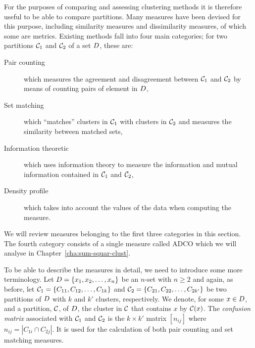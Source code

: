 For the purposes of comparing and assessing clustering methods it is therefore
useful to be able to compare partitions.  Many measures have been devised for
this purpose, including similarity measures and dissimilarity measures, of
which some are metrics.  Existing methods fall into four main categories; for
two partitions $\mathcal{C}_1$ and $\mathcal{C}_2$ of a set $D$, these are:
\begin{description}
\item[Pair counting] which measures the agreement and disagreement between
  $\mathcal{C}_1$ and $\mathcal{C}_2$ by means of counting pairs of element in $D$,
\item[Set matching] which ``matches'' clusters in $\mathcal{C}_1$ with clusters in
  $\mathcal{C}_2$ and measures the similarity between matched sets,
\item[Information theoretic] which uses information theory to measure the
  information and mutual information contained in $\mathcal{C}_1$ and $\mathcal{C}_2$,
\item[Density profile] which takes into account the values of the data when
  computing the measure.
\end{description}

We will review measures belonging to the first three categories in this
section.  The fourth category consists of a single measure called ADCO which
we will analyse in Chapter~\ref{cha:sum-squar-clust}.

To be able to describe the measures in detail, we need to introduce some more
terminology.  Let $D = \{x_1,x_2,\dotsc,x_n\}$ be an $n$-set with $n \geq
2$ and again, as before, let $\mathcal{C}_1 = \{C_{11},C_{12},\dotsc,C_{1k}\}$ and
$\mathcal{C}_2 = \{C_{21},C_{22},\dotsc,C_{2k'}\}$ be two partitions of $D$ with
$k$ and $k'$ clusters, respectively.  We denote, for some $x \in D$, and a
partition, $\mathcal{C}$, of $D$, the cluster in $\mathcal{C}$ that contains $x$ by
$\mathcal{C}(x)$.  The \textit{confusion matrix} associated with $\mathcal{C}_1$ and
$\mathcal{C}_2$ is the $k \times k'$ matrix $[n_{ij}]$ where $n_{ij} = |C_{1i} \cap
C_{2j}|$.  It is used for the calculation of both pair counting and set
matching measures.

